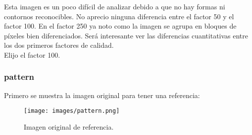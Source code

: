 \documentclass[12pt,a4paper]{article}
\begin{document}
Esta imagen es un poco difícil de analizar debido a que no hay formas ni contornos reconocibles. No aprecio ninguna diferencia entre el factor 50 y el factor 100. En el factor 250 ya noto como la imagen se agrupa en bloques de píxeles bien diferenciados. Será interesante ver las diferencias cuantitativas entre los dos primeros factores de calidad.\\

Elijo el factor 100.


\subsubsection{pattern}
Primero se muestra la imagen original para tener una referencia:
\begin{figure}[H]
    \centering
    \texttt{[image: images/pattern.png]}
    \caption[Referencia - pattern]{Imagen original de referencia.}
    
\end{figure}
    \vspace{0.5cm}
\end{document}
